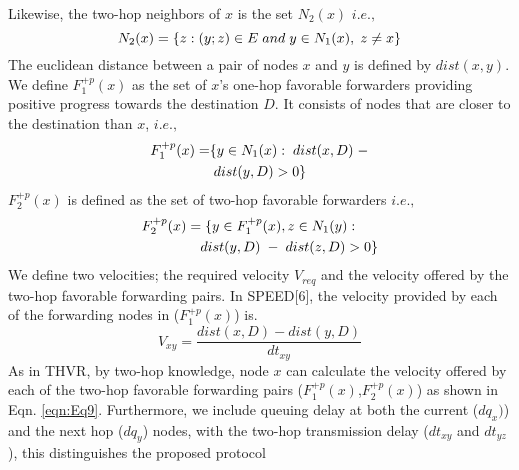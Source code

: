 \documentclass[fleqn,twoside]{article}
\begin{document}
Likewise, the two-hop neighbors of $x$ is the set $N_2(x)$ $i.e.,$
\begin{equation}
N_2(x) = \{z:(y;z) \in E \hspace{0.1cm} and \hspace{0.1cm} y \in N_1(x), \hspace{0.1cm} z \neq x\}
\label{eqn:Eq5}
\end{equation}
The euclidean distance between a pair of nodes $x$ and $y$ is defined by $dist(x,y)$. We define $F_{1}^{+p}(x)$ as the set of $x$'s one-hop favorable forwarders providing positive progress towards the destination $D$. It consists of nodes that are closer to the destination than $x$, $i.e.,$
\begin{equation}
\begin{split}
F_1^{+p}(x) = &\{y \in N_1(x): \hspace{0.1cm} dist(x,D) \hspace{0.1cm} - \\
              &\hspace{0.1cm} dist(y,D) > 0\}
\label{eqn:Eq6}
\end{split}
\end{equation}
$F_{2}^{+p}(x)$ is defined as the set of two-hop favorable forwarders $i.e.,$
\begin{equation}
\begin{split}
F_2^{+p}(x)& = \{y\in F_1^{+p}(x),z\in N_1(y):\hspace{0.1cm} \\
           & \quad dist(y,D)\hspace{0.1cm}-\hspace{0.1cm} dist(z,D)>0\}
\label{eqn:Eq7}
\end{split}
\end{equation}
We define two velocities; the required velocity $V_{req}$ and the velocity offered by the two-hop favorable forwarding pairs. In SPEED[6], the velocity provided by each of the forwarding nodes in ($F_1^{+p}(x)$) is.
\begin{equation}
V_{xy} = \frac{dist(x,D) - dist(y,D)}{dt_{xy}}
\label{eqn:Eq8}
\end{equation}
As in THVR\cite{ERTD2HI}, by two-hop knowledge, node $x$ can calculate the velocity offered by each of the two-hop favorable forwarding pairs ($F_1^{+p}(x)$,$F_2^{+p}(x)$) as shown in Eqn. \ref{eqn:Eq9}. Furthermore, we include queuing delay at both the current ($dq_x)$) and the next hop ($dq_y$) nodes, with the two-hop transmission delay ($dt_{xy}$ and $dt_{yz}$), this distinguishes the proposed protocol
\end{document}
